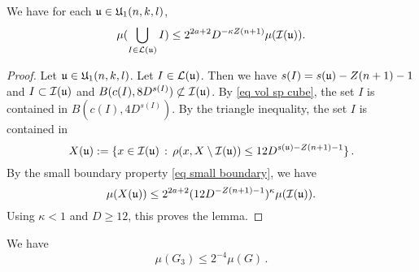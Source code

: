
\begin{lemma}\label{lulemma}
We have for each $\mathfrak u\in \mathfrak U_1(n,k,l)$,
\begin{equation}
\mu(\bigcup_{I\in \mathcal{L}(\mathfrak u)} I)
\le 2^{2a+2} D^{-\kappa Z(n+1)}
        \mu(\mathcal{I}(\mathfrak{u})).
\end{equation}

\end{lemma}


\begin{proof}
    Let $\mathfrak u\in \mathfrak U_1(n,k,l)$.
Let $I \in \mathcal{L}(\mathfrak u)$. Then we have $s(I) = s(\mathfrak u) - Z(n+1) - 1$ and $I \subset \mathcal{I}(\mathfrak u)$ and $B(c(I), 8D^{s(I)}) \not \subset \mathcal{I}(\mathfrak u)$.
By \eqref{eq vol sp cube}, the set $I$
is contained in $B(c(I), 4D^{s(I)})$.
By the triangle inequality, the set $I$
is contained in
\begin{equation}
    X(\mathfrak u):=\{x \in \mathcal{I}(\mathfrak u) \, : \, \rho(x, X \setminus \mathcal{I}(\mathfrak u)) \leq 12 D^{s(\mathfrak u) - Z(n+1)-1}\}\,.
\end{equation}
    By the small boundary property \eqref{eq small boundary}, we have
    $$
        \mu(X(\mathfrak u)) \le
        2^{2a+2}(12 D^{-Z(n+1)-1})^\kappa
        \mu(\mathcal{I}(\mathfrak{u})).
    $$
Using $\kappa<1$ and $D \ge 12$, this proves the lemma.
\end{proof}














    \begin{lemma}\label{g3bound}

        We have
\begin{equation}
    \mu(G_3)\le 2^{-4} \mu(G)\, .
\end{equation}
    \end{lemma}



